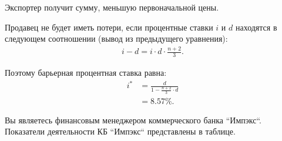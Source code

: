 \documentclass[12pt, table]{exam}
\begin{document}
\begin{questions}
\begin{subparts}
\begin{solution}[6em]
		Экспортер получит сумму, меньшую первоначальной цены. 
		
		Продавец не будет иметь потери, если процентные ставки $i$ и $d$ находятся в следующем соотношении (вывод из предыдущего уравнения):
		\begin{align}
		i-d=i \cdot d \cdot \frac{n+2}{3}.
		\end{align}
		
		Поэтому барьерная процентная ставка равна:
		\begin{align}
		i^*&=\frac{d}{1-\frac{n+2}{3} \cdot d}\\
		&=8.57\%.\nonumber
		\end{align}
		
	\end{solution}
\end{subparts}
\addpoints

\pagebreak
\question[20] Вы являетесь финансовым менеджером коммерческого банка ``Импэкс``. 
Показатели деятельности КБ ``Импэкс`` представлены в таблице.


\end{questions}
\end{document}
